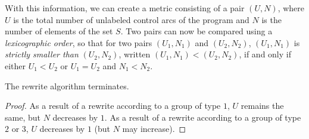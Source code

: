 With this information, we can create a metric consisting of a pair
$(U,N)$, where $U$ is the total number of unlabeled control arcs of
the program and $N$ is the number of elements of the set $S$.  Two
pairs can now be compared using a \emph{lexicographic order}, so that
for two pairs $(U_1,N_1)$ and $(U_2,N_2)$, $(U_1,N_1)$ is
\emph{strictly smaller than} $(U_2,N_2)$, written $(U_1,N_1) <
(U_2,N_2)$, if and only if either $U_1 < U_2$ or $U_1 = U_2$ and $N_1
< N_2$.

\begin{theorem}
The rewrite algorithm terminates.
\end{theorem}

\begin{proof}
As a result of a rewrite according to a group of type $1$, $U$
remains the same, but $N$ decreases by $1$.  As a result of a rewrite
according to a group of type $2$ or $3$, $U$ decreases by $1$ (but $N$
may increase).
\end{proof}
